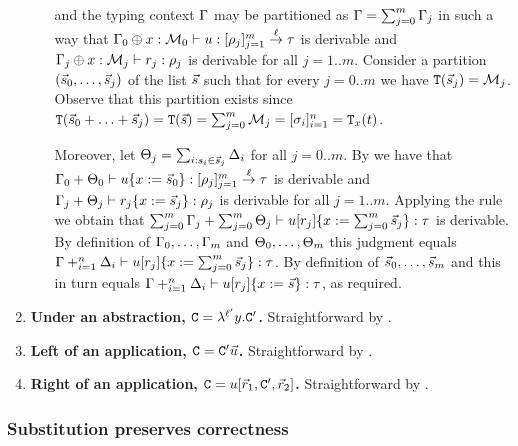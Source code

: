 \begin{enumerate}
\begin{enumerate}
      and
      the typing context $\Gamma$
      may be partitioned as $\Gamma = \sum_{j=0}^{m} \Gamma_j$
      in such a way that
      $\Gamma_0 \oplus x : \mathcal{M}_0 \vdash u : [\rho_j]_{j=1}^m \overset{\ell}{\to} \tau$
      is derivable
      and
      $\Gamma_j \oplus x : \mathcal{M}_j \vdash r_j : \rho_j$ is derivable for all $j=1..m$.
      Consider a partition $(\vec{s}_0,\hdots,\vec{s}_j)$
      of the list $\vec{s}$ 
      such that for every $j=0..m$ we have $\mathtt{T}(\vec{s}_j) = \mathcal{M}_j$.
      Observe that this partition exists since $\mathtt{T}(\vec{s}_0 + \hdots + \vec{s}_j) = \mathtt{T}(\vec{s}) = \sum_{j=0}^m \mathcal{M}_j = [\sigma_i]_{i=1}^n = \mathtt{T}_{x}(t)$.

      Moreover, let $\Theta_j = \sum_{i : s_i \in \vec{s}_j} \Delta_i$ for all $j=0..m$.
      By \ih we have that
      $\Gamma_0 + \Theta_0 \vdash u\{x := \vec{s}_0\} : [\rho_j]_{j=1}^m \overset{\ell}{\to} \tau$
      is derivable
      and
      $\Gamma_j + \Theta_j \vdash r_j\{x := \vec{s}_j\} : \rho_j$
      is derivable for all $j=1..m$.
      Applying the \indrulename{\toE} rule we obtain
      that
      $\sum_{j=0}^m \Gamma_j + \sum_{j=0}^m \Theta_j \vdash u[r_j]\{x := \sum_{j=0}^m \vec{s}_j\} : \tau$
      is derivable.
      By definition of
      $\Gamma_0,\hdots,\Gamma_m$ and
      $\Theta_0,\hdots,\Theta_m$
      this judgment equals
      $\Gamma +_{i=1}^n \Delta_i \vdash u[r_j]\{x := \sum_{j=0}^m \vec{s}_j\} : \tau$.
      By definition of $\vec{s}_0,\hdots,\vec{s}_m$
      and 
      this in turn equals
      $\Gamma +_{i=1}^n \Delta_i \vdash u[r_j]\{x := \vec{s}\} : \tau$,
      as required.
    \end{enumerate}
  \item {\bf Under an abstraction, $\mathtt{C} = \lambda^{\ell'} y. \mathtt{C}'$.}
    Straightforward by \ih.
  \item {\bf Left of an application, $\mathtt{C} = \mathtt{C}'\vec{u}$.}
    Straightforward by \ih.
  \item {\bf Right of an application, $\mathtt{C} = u[\vec{r}_1,\mathtt{C}',\vec{r}_2]$.}
    Straightforward by \ih.
  \end{enumerate}

\subsubsection{Substitution preserves correctness}


